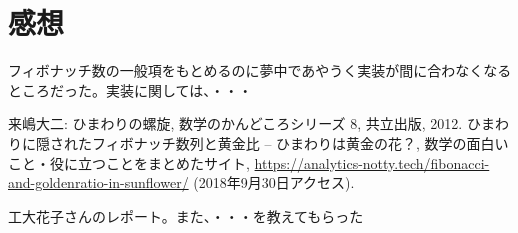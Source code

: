 \documentclass[a4j]{ujarticle}
\begin{document}
\section{感想}
フィボナッチ数の一般項をもとめるのに夢中であやうく実装が間に合わなくなるところだった。実装に関しては、・・・


\begin{thebibliography}{99}
 来嶋大二: ひまわりの螺旋, 数学のかんどころシリーズ 8, 共立出版, 2012.
 ひまわりに隠されたフィボナッチ数列と黄金比 – ひまわりは黄金の花？, 数学の面白いこと・役に立つことをまとめたサイト, \url{https://analytics-notty.tech/fibonacci-and-goldenratio-in-sunflower/} (2018年9月30日アクセス).

 工大花子さんのレポート。また、・・・を教えてもらった 

\end{thebibliography}
\end{document}
